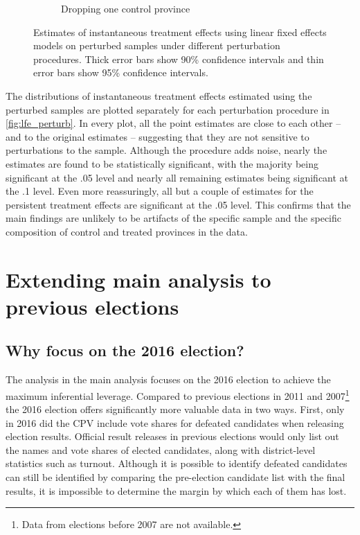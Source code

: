 \documentclass[12pt]{article}
\newcommand\fnote[1]{\footnote{\baselineskip=2\normalbaselineskip#1}}
\newcommand{\1}{\mathbbm{1}}
\begin{document}
\begin{figure}[!htbp]
\begin{subfigure}{.8\textwidth}
		\captionsetup{singlelinecheck=off, justification=centering}
		\caption{Dropping one control province}
	\end{subfigure}
	\caption[Estimated linear fixed effects treatment effects for perturbed samples]{Estimates of instantaneous treatment effects using linear fixed effects models on perturbed samples under different perturbation procedures. Thick error bars show 90\% confidence intervals and thin error bars show 95\% confidence intervals.}
	\label{fig:lfe_perturb}
\end{figure}

The distributions of instantaneous treatment effects estimated using the perturbed samples are plotted separately for each perturbation procedure in \autoref{fig:lfe_perturb}. In every plot, all the point estimates are close to each other -- and to the original estimates -- suggesting that they are not sensitive to perturbations to the sample. Although the procedure adds noise, nearly the estimates are found to be statistically significant, with the majority being significant at the .05 level and nearly all remaining estimates being significant at the .1 level. Even more reassuringly, all but a couple of  estimates for the persistent treatment effects are significant at the .05 level. This confirms that the main findings are unlikely to be artifacts of the specific sample and the specific composition of control and treated provinces in the data. 

\section{Extending main analysis to previous elections}
\label{app:previous_elections}

\subsection{Why focus on the 2016 election?}

The analysis in the main analysis focuses on the 2016 election to achieve the maximum inferential leverage. Compared to previous elections in 2011 and 2007\fnote{Data from elections before 2007 are not available.} the 2016 election offers significantly more valuable data in two ways. First, only in 2016 did the CPV include vote shares for defeated candidates when releasing election results. Official result releases in previous elections would only list out the names and vote shares of elected candidates, along with district-level statistics such as turnout. Although it is possible to identify defeated candidates can still be identified by comparing the pre-election candidate list with the final results, it is impossible to determine the margin by which each of them has lost. 
\end{document}
